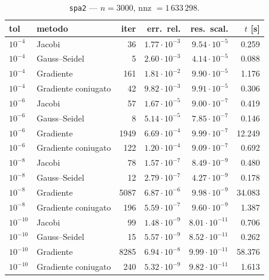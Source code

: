 \documentclass[11pt,a4paper]{article}
\begin{document}
\begin{table}[h]
\centering
\caption{\texttt{spa2} --- $n=3000$, nnz $=1\,633\,298$.}
\begin{tabular}{l l r r r r}
\toprule
tol & metodo & iter & err.\ rel. & res.\ scal. & $t$ [s] \\
\midrule
$10^{-4}$  & Jacobi              & 36   & $1.77\cdot10^{-3}$ & $9.54\cdot10^{-5}$ & 0.259 \\
$10^{-4}$  & Gauss--Seidel       & 5    & $2.60\cdot10^{-3}$ & $4.14\cdot10^{-5}$ & 0.088 \\
$10^{-4}$  & Gradiente           & 161  & $1.81\cdot10^{-2}$ & $9.90\cdot10^{-5}$ & 1.176 \\
$10^{-4}$  & Gradiente coniugato & 42   & $9.82\cdot10^{-3}$ & $9.91\cdot10^{-5}$ & 0.306 \\
\midrule
$10^{-6}$  & Jacobi              & 57   & $1.67\cdot10^{-5}$ & $9.00\cdot10^{-7}$ & 0.419 \\
$10^{-6}$  & Gauss--Seidel       & 8    & $5.14\cdot10^{-5}$ & $7.85\cdot10^{-7}$ & 0.146 \\
$10^{-6}$  & Gradiente           & 1949 & $6.69\cdot10^{-4}$ & $9.99\cdot10^{-7}$ & 12.249 \\
$10^{-6}$  & Gradiente coniugato & 122  & $1.20\cdot10^{-4}$ & $9.09\cdot10^{-7}$ & 0.692 \\
\midrule
$10^{-8}$  & Jacobi              & 78   & $1.57\cdot10^{-7}$ & $8.49\cdot10^{-9}$ & 0.480 \\
$10^{-8}$  & Gauss--Seidel       & 12   & $2.79\cdot10^{-7}$ & $4.27\cdot10^{-9}$ & 0.178 \\
$10^{-8}$  & Gradiente           & 5087 & $6.87\cdot10^{-6}$ & $9.98\cdot10^{-9}$ & 34.083 \\
$10^{-8}$  & Gradiente coniugato & 196  & $5.59\cdot10^{-7}$ & $9.60\cdot10^{-9}$ & 1.387 \\
\midrule
$10^{-10}$ & Jacobi              & 99   & $1.48\cdot10^{-9}$ & $8.01\cdot10^{-11}$ & 0.706 \\
$10^{-10}$ & Gauss--Seidel       & 15   & $5.57\cdot10^{-9}$ & $8.52\cdot10^{-11}$ & 0.262 \\
$10^{-10}$ & Gradiente           & 8285 & $6.94\cdot10^{-8}$ & $9.99\cdot10^{-11}$ & 58.376 \\
$10^{-10}$ & Gradiente coniugato & 240  & $5.32\cdot10^{-9}$ & $9.82\cdot10^{-11}$ & 1.613 \\
\bottomrule
\end{tabular}
\end{table}
\end{document}
